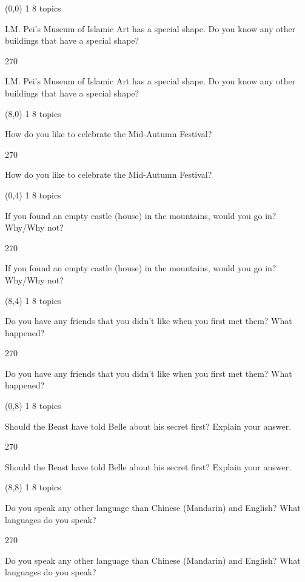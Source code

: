 \documentclass[a4paper]{article}
\newenvironment{itemize*}%
{\begin{itemize}%
 \setlength{\itemsep}{0.5cm}%
 \setlength{\parsep}{0pt}%
 \setlength{\parskip}{0pt}}%
{\end{itemize}}
\newcommand{\mycard}[3]{%
	\small #1 #2
	\par
	\parbox[t][6.8cm][c]{9.5cm}{%
	\par
	\myleft{#3}
	\par
	\myright{#3}
	}
}
\newcommand{\myleft}[1]{%
	\begin{sideways}
	\hspace*{-0.9cm}
		\parbox[t][2.7cm][t]{6.5cm}{%
		\large #1
		}
	\end{sideways}
}
\newcommand{\myright}[1]{%
	\hspace*{6.5cm}
	\begin{turn}{270}
	\hspace*{-7.1cm}
		\parbox[t][2.7cm][t]{6.5cm}{%
		\large #1
		}
	\end{turn}
}
\begin{document}
\begin{textblock}{8}(0,0)
\mycard{1}{8 topics}{
\begin{itemize*}
\item I.M. Pei's Museum of Islamic Art has a special shape. Do you know any other buildings that have a special shape?
\end{itemize*}
}
\end{textblock}

\begin{textblock}{8}(8,0)
\mycard{1}{8 topics}{
\begin{itemize*}
\item How do you like to celebrate the Mid-Autumn Festival?
\end{itemize*}
}
\end{textblock}

\begin{textblock}{8}(0,4)
\mycard{1}{8 topics}{
\begin{itemize*}
\item If you found an empty castle (house) in the mountains, would you go in? Why/Why not?
\end{itemize*}
}
\end{textblock}

\begin{textblock}{8}(8,4)
\mycard{1}{8 topics}{
\begin{itemize*}
\item Do you have any friends that you didn't like when you first met them? What happened?
\end{itemize*}
}
\end{textblock}

\begin{textblock}{8}(0,8)
\mycard{1}{8 topics}{
\begin{itemize*}
\item Should the Beast have told Belle about his secret first? Explain your answer.
\end{itemize*}
}
\end{textblock}

\begin{textblock}{8}(8,8)
\mycard{1}{8 topics}{
\begin{itemize*}
\item Do you speak any other language than Chinese (Mandarin) and English? What languages do you speak?
\end{itemize*}
}
\end{textblock}
\end{document}
